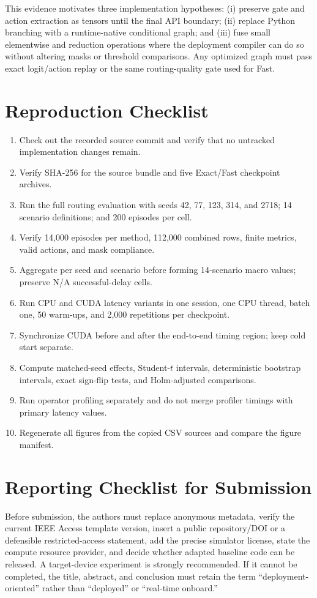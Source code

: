 \documentclass{ieeeaccess}
\begin{document}
This evidence motivates three implementation hypotheses: (i) preserve gate and action extraction as tensors until the final API boundary; (ii) replace Python branching with a runtime-native conditional graph; and (iii) fuse small elementwise and reduction operations where the deployment compiler can do so without altering masks or threshold comparisons. Any optimized graph must pass exact logit/action replay or the same routing-quality gate used for Fast.

\section{Reproduction Checklist}

\begin{enumerate}
\item Check out the recorded source commit and verify that no untracked implementation changes remain.
\item Verify SHA-256 for the source bundle and five Exact/Fast checkpoint archives.
\item Run the full routing evaluation with seeds 42, 77, 123, 314, and 2718; 14 scenario definitions; and 200 episodes per cell.
\item Verify 14,000 episodes per method, 112,000 combined rows, finite metrics, valid actions, and mask compliance.
\item Aggregate per seed and scenario before forming 14-scenario macro values; preserve N/A successful-delay cells.
\item Run CPU and CUDA latency variants in one session, one CPU thread, batch one, 50 warm-ups, and 2,000 repetitions per checkpoint.
\item Synchronize CUDA before and after the end-to-end timing region; keep cold start separate.
\item Compute matched-seed effects, Student-$t$ intervals, deterministic bootstrap intervals, exact sign-flip tests, and Holm-adjusted comparisons.
\item Run operator profiling separately and do not merge profiler timings with primary latency values.
\item Regenerate all figures from the copied CSV sources and compare the figure manifest.
\end{enumerate}

\section{Reporting Checklist for Submission}

Before submission, the authors must replace anonymous metadata, verify the current IEEE Access template version, insert a public repository/DOI or a defensible restricted-access statement, add the precise simulator license, state the compute resource provider, and decide whether adapted baseline code can be released. A target-device experiment is strongly recommended. If it cannot be completed, the title, abstract, and conclusion must retain the term ``deployment-oriented'' rather than ``deployed'' or ``real-time onboard.''

\EOD
\end{document}
